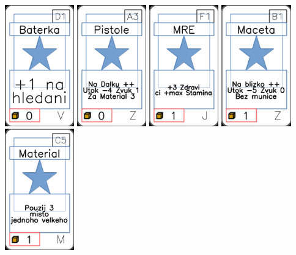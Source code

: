 \documentclass[a4paper]{article}
\begin{document}
	\includegraphics[width=3.0cm]{img-1_75}
	\includegraphics[width=3.0cm]{img-1_92}
	\includegraphics[width=3.0cm]{img-1_25}
	\includegraphics[width=3.0cm]{img-1_95}
	\includegraphics[width=3.0cm]{img-1_44}
\end{document}
